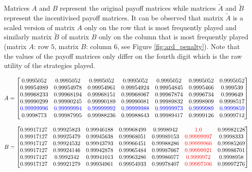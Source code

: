 Matrices \(A\) and \(B\) represent the original payoff matrices while matrices
\(\tilde{A}\) and \(\tilde{B}\) represent the incentivised payoff matrices.
It can be observed that matrix \(\tilde{A}\) is a scaled version of matrix 
\(A\) only on the row that is most frequently played and similarly matrix 
\(\tilde{B}\) of matrix \(B\) only on the column that is most frequently played
(matrix \(A\): row \(5\), matrix \(B\): column \(6\), see Figure 
\ref{fig:ard_penalty}).
Note that the values of the payoff matrices only differ on the fourth digit
which is the raw utility of the strategies played.

\tiny
\begin{equation*}
    A = 
    \begin{bmatrix}
        0.9995052 & 0.9995052 & 0.9995052 & 0.9995052 & 0.9995052 
        & 0.9995052 & 0.9995052 \\
        0.99954989 & 0.99954978 & 0.99954961 & 0.99954924 & 0.99954845 
        & 0.9995466 & 0.999539 \\
        0.99968233 & 0.99968194 & 0.99968151 & 0.99968067 & 0.99967874 
        & 0.9996734 & 0.999649  \\
        0.99990299 & 0.99990245 & 0.99990189 & 0.99990081 & 0.99989832
        & 0.9998909 & 0.9998517 \\
        \color{blue}0.99999996 & \color{blue}0.99999994 & \color{blue}0.99999992 
        & \color{blue}0.99999988 & \color{blue}0.99999973 & \color{blue}0.9999989 
        & \color{blue}0.9999859 \\
        0.9998773 & 0.99987995 & 0.99988236 & 0.99988643 & 0.99989417 
        & 0.9999126 & 0.9999712
    \end{bmatrix}
\end{equation*}

\begin{equation*}
    B = 
    \begin{bmatrix}
        0.99917127 & 0.99925823 & 0.99946188 & 0.99968499 & 0.9998942 
        & \color{red}1.0 & 0.99982128 \\
        0.99917127 & 0.99925479 & 0.99945638 & 0.99968051 & 0.99989153 
        & \color{red}0.99999997 & 0.9998333  \\
        0.99917127 & 0.99924532 & 0.99943793 & 0.99966451 & 0.99988286 
        & \color{red}0.99999966 & 0.99985269 \\
        0.99917127 & 0.99924146 & 0.99942878 & 0.99965484 & 0.99987667 
        & \color{red}0.99999921 & 0.99986701 \\
        0.99917127 & 0.9992342 &  0.99941013 & 0.99963286 & 0.99986077 
        & \color{red}0.9999972 & 0.9998958  \\
        0.99917127 & 0.99921279 & 0.99934961 & 0.99954933 & 0.99978407 
        & \color{red}0.99997106 & 0.99997276 \\
    \end{bmatrix}
\end{equation*}

